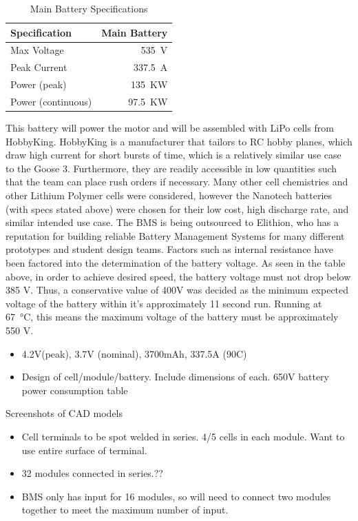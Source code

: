 \documentclass{report}
\begin{document}
    \begin{table}[H]
        \centering
        \begin{tabular}{@{}lr@{}} \toprule
            Specification & Main Battery\\ \midrule
            Max Voltage & \SI{535}{V}\\
            Peak Current & \SI{337.5}{A}\\
            Power (peak) & \SI{135}{KW}\\
            Power (continuous) & \SI{97.5}{KW}\\ \bottomrule
        \end{tabular}
        \caption{Main Battery Specifications}
    \end{table}
    This battery will power the motor and will be assembled with LiPo cells from HobbyKing. HobbyKing is a manufacturer that tailors to RC hobby planes, which draw high current for short bursts of time, which is a relatively similar use case to the Goose 3.  Furthermore, they are readily accessible in low quantities such that the team can place rush orders if necessary.  Many other cell chemistries and other Lithium Polymer cells were considered, however the Nanotech batteries (with specs stated above) were chosen for their low cost, high discharge rate, and similar intended use case. The BMS is being outsourced to Elithion, who has a reputation for building reliable Battery Management Systems for many different prototypes and student design teams. Factors such as internal resistance have been factored into the determination of the battery voltage. As seen in the table above, in order to achieve desired speed, the battery voltage must not drop below 385 V.  Thus, a conservative value of 400V was decided as the minimum expected voltage of the battery within it’s approximately 11 second run. Running at \SI{67}{\celsius}, this means the maximum voltage of the battery must be approximately 550 V.
    \begin{itemize}
        \item 4.2V(peak), 3.7V (nominal), 3700mAh, 337.5A (90C)
        \item Design of cell/module/battery. Include dimensions of each.
        650V battery power consumption table
    \end{itemize}
    Screenshots of CAD models
    \begin{itemize}
        \item Cell terminals to be spot welded in series. 4/5 cells in each module. Want to use entire surface of terminal.
        \item 32 modules connected in series.??
        \item BMS only has input for 16 modules, so will need to connect two modules together to meet the maximum number of input. 
    \end{itemize}
\end{document}
